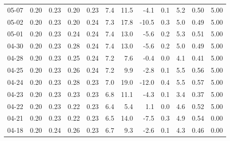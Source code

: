 \begin{threeparttable}
{\begin{tabular}{lrrrrrrrrrrr}
  05-07 &          0.20 &          0.23 &          0.20 &        0.23 &                 7.4 &                11.5 &       -4.1 &                 0.1 &              5.2 &            0.50 &                   5.00 \\
  05-02 &          0.20 &          0.23 &          0.20 &        0.24 &                 7.3 &                17.8 &      -10.5 &                 0.3 &              5.0 &            0.49 &                   5.00 \\
  05-01 &          0.20 &          0.23 &          0.24 &        0.24 &                 7.4 &                13.0 &       -5.6 &                 0.2 &              5.3 &            0.51 &                   5.00 \\
  04-30 &          0.20 &          0.23 &          0.28 &        0.24 &                 7.4 &                13.0 &       -5.6 &                 0.2 &              5.0 &            0.49 &                   5.00 \\
  04-28 &          0.20 &          0.23 &          0.25 &        0.24 &                 7.2 &                 7.6 &       -0.4 &                 0.0 &              4.1 &            0.41 &                   5.00 \\
  04-25 &          0.20 &          0.23 &          0.26 &        0.24 &                 7.2 &                 9.9 &       -2.8 &                 0.1 &              5.5 &            0.56 &                   5.00 \\
  04-24 &          0.20 &          0.23 &          0.28 &        0.23 &                 7.0 &                19.0 &      -12.0 &                 0.4 &              5.5 &            0.57 &                   5.00 \\
  04-23 &          0.20 &          0.23 &          0.23 &        0.23 &                 6.8 &                11.1 &       -4.3 &                 0.1 &              3.4 &            0.37 &                   5.00 \\
  04-22 &          0.20 &          0.23 &          0.22 &        0.23 &                 6.4 &                 5.4 &        1.1 &                 0.0 &              4.6 &            0.52 &                   5.00 \\
  04-21 &          0.20 &          0.23 &          0.22 &        0.23 &                 6.5 &                14.0 &       -7.5 &                 0.3 &              4.9 &            0.54 &                   0.00 \\
  04-18 &          0.20 &          0.24 &          0.26 &        0.23 &                 6.7 &                 9.3 &       -2.6 &                 0.1 &              4.3 &            0.46 &                   0.00 \\

\end{tabular}}
\end{threeparttable}

